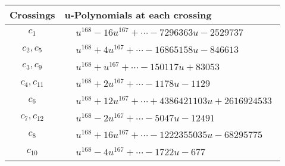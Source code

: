 \documentclass[1p]{elsarticle_modified}
\theoremstyle{definition}
\begin{document}
\begin{tabular}{m{50pt}|m{274pt}}
Crossings & \hspace{64pt}u-Polynomials at each crossing \\
\hline $$\begin{aligned}c_{1}\end{aligned}$$&$\begin{aligned}
&u^{168}-16 u^{167}+\cdots-7296363 u-2529737
\end{aligned}$\\
\hline $$\begin{aligned}c_{2},c_{5}\end{aligned}$$&$\begin{aligned}
&u^{168}+4 u^{167}+\cdots-16865158 u-846613
\end{aligned}$\\
\hline $$\begin{aligned}c_{3},c_{9}\end{aligned}$$&$\begin{aligned}
&u^{168}+u^{167}+\cdots-150117 u+83053
\end{aligned}$\\
\hline $$\begin{aligned}c_{4},c_{11}\end{aligned}$$&$\begin{aligned}
&u^{168}+2 u^{167}+\cdots-1178 u-1129
\end{aligned}$\\
\hline $$\begin{aligned}c_{6}\end{aligned}$$&$\begin{aligned}
&u^{168}+12 u^{167}+\cdots+4386421103 u+2616924533
\end{aligned}$\\
\hline $$\begin{aligned}c_{7},c_{12}\end{aligned}$$&$\begin{aligned}
&u^{168}-2 u^{167}+\cdots-5047 u-12491
\end{aligned}$\\
\hline $$\begin{aligned}c_{8}\end{aligned}$$&$\begin{aligned}
&u^{168}+16 u^{167}+\cdots-1222355035 u-68295775
\end{aligned}$\\
\hline $$\begin{aligned}c_{10}\end{aligned}$$&$\begin{aligned}
&u^{168}-4 u^{167}+\cdots-1722 u-677
\end{aligned}$\\
\hline
\end{tabular}\\~\\
\end{document}
